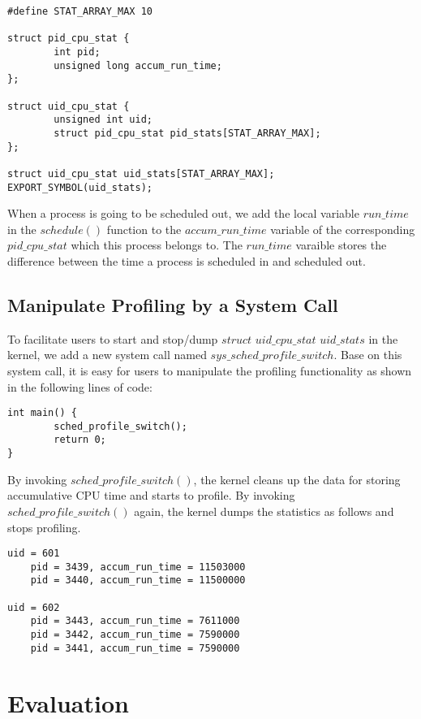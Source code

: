 \documentclass[11pt]{article}
\begin{document}
\begin{lstlisting}[style=CStyle]
#define STAT_ARRAY_MAX 10

struct pid_cpu_stat {
        int pid;
        unsigned long accum_run_time;
};
   
struct uid_cpu_stat {
        unsigned int uid;
        struct pid_cpu_stat pid_stats[STAT_ARRAY_MAX];
};

struct uid_cpu_stat uid_stats[STAT_ARRAY_MAX];
EXPORT_SYMBOL(uid_stats);
\end{lstlisting}

When a process is going to be scheduled out, we add the local variable $run\_time$ in the $schedule()$ function to the $accum\_run\_time$ variable of the corresponding $pid\_cpu\_stat$ which this process belongs to. The $run\_time$ varaible  stores the difference between the time a process is scheduled in and scheduled out. 

\subsection{Manipulate Profiling by a System Call}

To facilitate users to start and stop/dump $struct$ $uid\_cpu\_stat$ $uid\_stats$ in the kernel, we add a new system call named $sys\_sched\_profile\_switch$. Base on this system call, it is easy for users to manipulate the profiling functionality as shown in the following lines of code:

\begin{lstlisting}[style=CStyle]
int main() {
        sched_profile_switch(); 
        return 0;
}
\end{lstlisting}

By invoking $sched\_profile\_switch()$, the kernel cleans up the data for storing accumulative CPU time and starts to profile. By invoking $sched\_profile\_switch()$ again, the kernel dumps the statistics as follows and stops profiling.

\begin{lstlisting}[style=CStyle]
uid = 601
    pid = 3439, accum_run_time = 11503000
    pid = 3440, accum_run_time = 11500000

uid = 602
    pid = 3443, accum_run_time = 7611000
    pid = 3442, accum_run_time = 7590000
    pid = 3441, accum_run_time = 7590000
\end{lstlisting}

\section{Evaluation}
\end{document}

